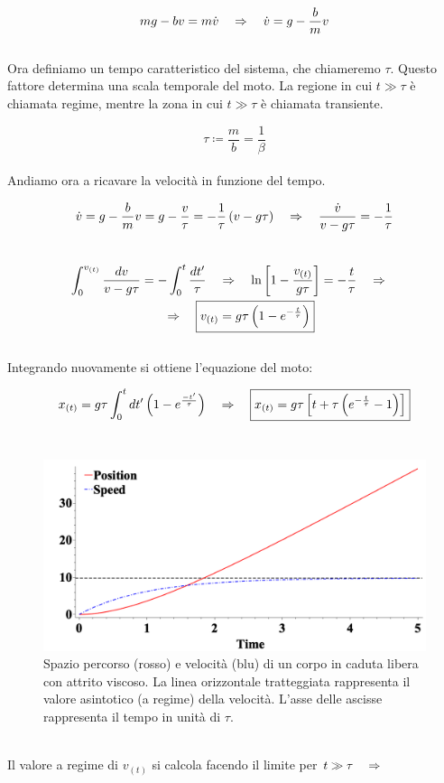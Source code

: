 \begin{equation}
    mg - bv = m\dot v \quad\Rightarrow\quad \dot v = g - \frac{b}{m}v
\end{equation}
\\
Ora definiamo un tempo caratteristico del sistema, che chiameremo $\tau$.
Questo fattore determina una scala temporale del moto. La regione in cui
$t\gg\tau$ è chiamata regime, mentre la zona in cui $t\gg\tau$ è chiamata
transiente.

\begin{equation}
    \boxed{\tau \coloneqq \frac{m}{b} = \frac1\beta}
\label{eq:forces:time_constant}
\end{equation}
\\
Andiamo ora a ricavare la velocità in funzione del tempo.

\begin{equation}
    \dot v = g - \frac bmv = g - \frac v\tau = -\frac1\tau\left( v - g\tau\right)
    \quad\Rightarrow\quad \frac{\dot v}{v -g\tau} = -\frac1\tau
\end{equation}
\\
\begin{multline}
   \int_0^{v_{(t)}}\frac{d v}{v -g\tau} = -\int_0^t\frac{dt'}\tau\quad\Rightarrow\quad
   \ln\left[ 1 - \frac{v_{(t)}}{g\tau}\right] = -\frac t\tau\quad\Rightarrow\quad
   \\\quad\Rightarrow\quad\boxed{v_{(t)} = g\tau\left(1-e^{-\frac t\tau}\right)}
\label{eq:forces:viscous_v}
\end{multline}
\\
Integrando nuovamente si ottiene l'equazione del moto:

\begin{equation}
    x_{(t)} = g\tau\int_0^tdt'\left(1-e^{\frac{-t'}\tau}\right) \quad\Rightarrow\quad
    \boxed{x_{(t)} = g\tau\left[ t + \tau\left( e^{-\frac t\tau} - 1\right)\right]}
\label{eq:forces:viscous_x}
\end{equation}
\\
\begin{figure}[htbp]
\center
        \includegraphics[width=13cm]{images/freefallXV.png}
        \caption{Spazio percorso (rosso) e velocità (blu) di un corpo in
        caduta libera con attrito viscoso. La linea orizzontale tratteggiata
        rappresenta il valore asintotico (a regime) della velocità.
        L'asse delle ascisse rappresenta il tempo in unità di $\tau$.}
\label{fig:forces:freefall:curves}
\end{figure}
\\
Il valore a regime di $v_{(t)}$ si calcola facendo il limite per
$t\gg\tau\quad\Rightarrow\quad$

